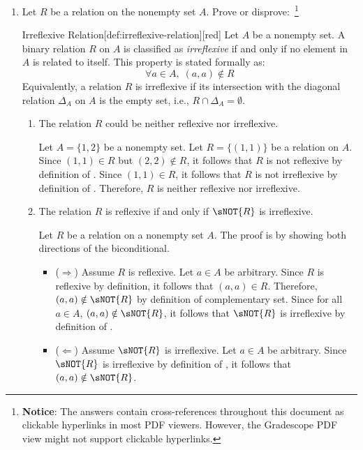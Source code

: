 \begin{enumerate}
  \newpage
  \item Let $R$ be a relation on the nonempty set $A$. Prove or disprove:~\footnote{
    \textbf{Notice}: The answers contain cross-references throughout this document as clickable hyperlinks in most PDF viewers. 
    However, the Gradescope PDF view might not support clickable hyperlinks.
  }
  \begin{define}{Irreflexive Relation}[def:irreflexive-relation][red]
    Let $A$ be a nonempty set. A binary relation $R$ on $A$ is classified as \emph{irreflexive} if and only if no element in $A$ is related to itself. This property is stated formally as:
    $$ \forall a \in A, \; (a,a) \notin R $$
    Equivalently, a relation $R$ is irreflexive if its intersection with the diagonal relation $\Delta_A$ on $A$ is the empty set, i.e., $R \cap \Delta_A = \emptyset$.
  \end{define}
  \begin{enumerate}
    \item The relation $R$ could be neither reflexive nor irreflexive.
      \begin{subprove}
        Let $A = \{1,2\}$ be a nonempty set. Let $R = \{(1,1)\}$ be a relation on $A$. 
        Since $(1,1) \in R$ but $(2,2) \notin R$, it follows that $R$ is not reflexive by definition of . 
        Since $(1,1) \in R$, it follows that $R$ is not irreflexive by definition of . 
        Therefore, $R$ is neither reflexive nor irreflexive.
      \end{subprove}
    \item The relation $R$ is reflexive if and only if $\sNOT{R}$ is irreflexive. 
      \begin{subprove}
        Let $R$ be a relation on a nonempty set $A$. 
        The proof is by showing both directions of the biconditional.
        \begin{itemize}
          \item ($\Rightarrow$) Assume $R$ is reflexive. Let $a \in A$ be arbitrary. 
          Since $R$ is reflexive by definition, it follows that $(a,a) \in R$. 
          Therefore, $(a,a) \notin \sNOT{R}$ by definition of complementary set. 
          Since for all $a \in A$, $(a,a) \notin \sNOT{R}$, it follows that $\sNOT{R}$ is irreflexive by definition of .
          \item ($\Leftarrow$) Assume $\sNOT{R}$ is irreflexive. Let $a \in A$ be arbitrary. 
          Since $\sNOT{R}$ is irreflexive by definition of , it follows that $(a,a) \notin \sNOT{R}$. 

\end{itemize}
\end{subprove}
\end{enumerate}
\end{enumerate}
